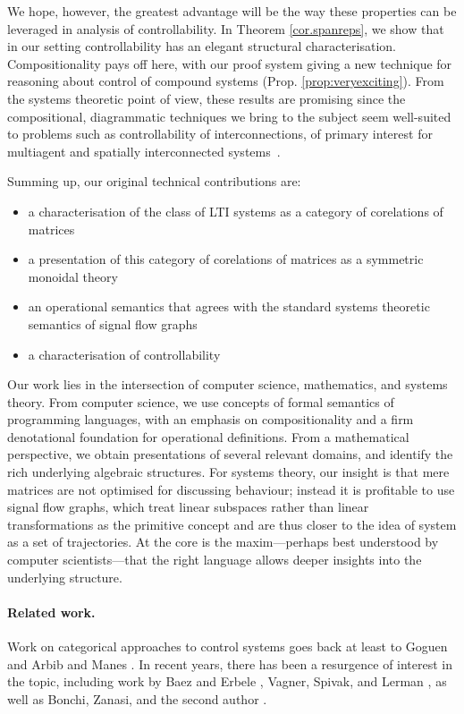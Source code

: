 We hope, however, the greatest advantage will be the way these properties can be
leveraged in analysis of controllability. In Theorem \ref{cor.spanreps}, we
show that in our setting controllability has an elegant structural
characterisation.  Compositionality pays off here, with our proof system giving
a new technique for reasoning about control of compound systems (Prop.
\ref{prop:veryexciting}).  From the systems theoretic point of view, these
results are promising since the compositional, diagrammatic techniques we bring
to the subject seem well-suited to problems such as controllability of
interconnections, of primary interest for multiagent and spatially
interconnected systems~\cite{OFM}.

\smallskip
Summing up, our original technical contributions are:
\begin{itemize}
\item a characterisation of the class of LTI systems as a category of corelations of matrices
\item a presentation of this category of corelations of matrices as a symmetric
  monoidal theory
\item an operational semantics that agrees with the standard systems theoretic
semantics of signal flow graphs
\item a characterisation of controllability
\end{itemize}

\smallskip

Our work lies in the intersection of computer science, mathematics, and systems
theory.  From computer science, we use concepts  of formal semantics of
programming languages, with an emphasis on compositionality and a firm
denotational foundation for operational definitions.  From a mathematical
perspective, we obtain presentations of several relevant domains, and identify
the rich underlying algebraic structures.  For systems theory, our insight is
that mere matrices are not optimised for discussing behaviour; instead it is
profitable to use signal flow graphs, which treat linear subspaces rather than
linear transformations as the primitive concept and are thus closer to the idea
of system as a set of trajectories. At the core is the maxim---perhaps best
understood by computer scientists---that the right language allows deeper
insights into the underlying structure.

\paragraph{Related work.}
Work on categorical approaches to control systems goes back at least to Goguen
\cite{Go} and Arbib and Manes \cite{AM}. In recent years, there has been a
resurgence of interest in the topic, including work by Baez and Erbele
\cite{BE}, Vagner, Spivak, and Lerman \cite{VSL}, as well as Bonchi, Zanasi, and
the second author \cite{BSZ1,BSZ2,BSZ3,Za}. 

